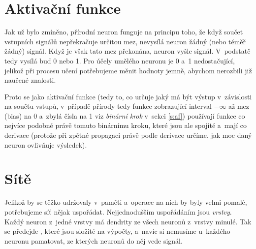 \documentclass[12pt]{report}			%
\begin{document}
				\section{Aktivační funkce}
					Jak už bylo zmíněno, přírodní neuron funguje na principu toho, že když součet vstupních signálů nepřekračuje určitou mez, nevysílá neuron žádný (nebo téměř žádný) signál. Když je však tato mez překonána, neuron vyšle signál. V~podstatě tedy vysílá buď 0 nebo 1. Pro účely umělého neuronu je 0 a~1 nedostačující, jelikož při procesu učení potřebujeme měnit hodnoty jemně, abychom nerozbili již naučené znalosti.
					
					Proto se jako aktivační funkce (tedy to, co určuje jaký má být výstup v~závislosti na součtu vstupů, v~případě přírody tedy funkce zobrazující interval $-\infty$ až mez (bias) na 0 a~zbylá čísla na 1 viz \emph{binární krok} v~sekci \ref{s:af}) používají funkce co nejvíce podobné právě tomuto binárnímu kroku, které jsou ale spojité a~mají co  derivace (protože při zpětné propagaci právě podle derivace určíme, jak moc daný neuron ovlivňuje výsledek).
				
				\section{Sítě} \label{s:net}
					Jelikož  by se těžko udržovaly v~paměti a~operace na nich by byly velmi pomalé, potřebujeme síť nějak uspořádat. Nejjednodušším uspořádáním jsou \emph{vrstvy}. Každý neuron z~jedné vrstvy má \gls{dendrit}y ze všech neuronů z~vrstvy minulé. Tak se předejde , které jsou složité na výpočty, a~navíc si nemusíme u~každého neuronu pamatovat, ze kterých neuronů do něj vede signál.
					
\end{document}
